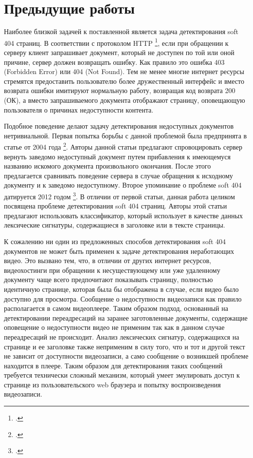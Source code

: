 \chapter{Предыдущие работы}

Наиболее близкой задачей к поставленной является задача детектирования soft 404 страниц. В соответствии с протоколом HTTP \footcite{Fielding2014}, если при обращении к серверу клиент запрашивает документ, который не доступен по той или оной причине, сервер должен возвращать ошибку. Как правило это ошибка 403 (Forbidden Error) или 404 (Not Found). Тем не менее многие интернет ресурсы стремятся предоставить пользователю более дружественный интерфейс и вместо возврата ошибки имитируют нормальную работу, возвращая код возврата 200 (ОК), а вместо запрашиваемого документа отображают страницу, оповещающую пользователя о причинах недоступности контента.

Подобное поведение делают задачу детектирования недоступных документов нетривиальной. Первая попытка борьбы с данной проблемой была предпринята в статье от 2004 года \footcite{Bar-Yossef2004}. Авторы данной статьи предлагают спровоцировать сервер вернуть заведомо недоступный документ путем прибавления к имеющемуся названию искомого документа произвольного окончания. После этого предлагается сравнивать поведение сервера в случае обращения к исходному документу и к заведомо недоступному. Второе упоминание о проблеме soft 404 датируется 2012 годом \footcite{Meneses2012}. В отличии от первой статьи, данная работа целиком посвящена проблеме детектирования soft 404 страниц. Авторы этой статьи предлагают использовать классификатор, который использует в качестве данных лексические сигнатуры, содержащиеся в заголовке или в тексте страницы.

К сожалению ни один из предложенных способов детектирования soft 404 документов не может быть применен к задаче детектирования неработающих видео. Это вызвано тем, что, в отличии от других интернет ресурсов, видеохостинги при обращении к несуществующему или уже удаленному документу чаще всего предпочитают показывать страницу, полностью идентичную странице, которая была бы отображена в случае, если видео было доступно для просмотра. Сообщение о недоступности видеозаписи как правило располагается в самом видеоплеере. Таким образом подход, основанный на детектировании переадресаций на заранее заготовленные документы, содержащие оповещение о недоступности видео не применим так как в данном случае переадресаций не происходит. Анализ лексических сигнатур, содержащихся на странице и ее заголовке также неприменим в силу того, что и тот и другой текст не зависит от доступности видеозаписи, а само сообщение о возникшей проблеме находится в плеере. Таким образом для детектирования таких сообщений требуется технически сложный механизм, который умеет эмулировать доступ к странице из пользовательского web браузера и попытку воспроизведения видеозаписи.